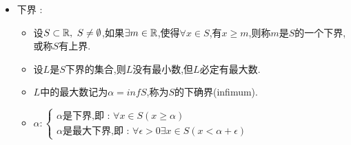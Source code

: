 {{{{\begin{itemize}
{                    \begin{itemize}
                        \item 设$S \subset \mathRealNumberCollection,\ S \neq \emptyset$,如果$\exists M \in \mathRealNumberCollection$,使得$\forall x \in S$,有$x \leq M$,则称$M$是$S$的一个上界,或称$S$有上界.
                        \item 设$U$是$S$上界的集合,则$U$没有最大数,但$U$必定有最小数.
                        \item $U$中的最小数记为$\beta = sup S$,称为$S$的上确界(supremum).
                        \item {
                              \(
                              \beta : \begin{cases}
                                  \beta\mbox{是上界,即 : }\forall x \in S(x \leq \beta) \\
                                  \beta\mbox{是最小上界,即 : }\forall \epsilon > 0 \exists x \in S (x > \beta - \epsilon)
                              \end{cases}
                              \)
                              }
                    \end{itemize}
                    }
              \item {
                    下界 :

                    \begin{itemize}
                        \item 设$S \subset \mathRealNumberCollection,\ S \neq \emptyset$,如果$\exists m \in \operatorname{\mathbb{R}}$,使得$\forall x \in S$,有$x \geq m$,则称$m$是$S$的一个下界,或称$S$有上界.
                        \item 设$L$是$S$下界的集合,则$L$没有最小数,但$L$必定有最大数.
                        \item $L$中的最大数记为$\alpha = inf S$,称为$S$的下确界(infimum).
                        \item {
                              \(
                              \alpha : \begin{cases}
                                  \alpha\mbox{是下界,即 : }\forall x \in S(x \geq \alpha) \\
                                  \alpha\mbox{是最大下界,即 : }\forall \epsilon > 0 \exists x \in S (x < \alpha + \epsilon)
                              \end{cases}
                              \)
                              }
                    \end{itemize}
                    }
          \end{itemize}
      }%

  }%

 }%

}%